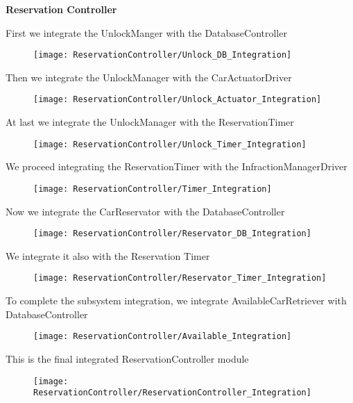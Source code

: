 \begin{Large}
\textbf{Reservation Controller}
\end{Large}

First we integrate the UnlockManger with the DatabaseController
\begin{figure}[H]
\centering
\texttt{[image: ReservationController/Unlock\_DB\_Integration]}
\end{figure}

Then we integrate the UnlockManager with the CarActuatorDriver
\begin{figure}[H]
\centering
\texttt{[image: ReservationController/Unlock\_Actuator\_Integration]}
\end{figure}

At last we integrate the UnlockManager with the ReservationTimer
\begin{figure}[H]
\centering
\texttt{[image: ReservationController/Unlock\_Timer\_Integration]}
\end{figure}

We proceed integrating the ReservationTimer with the InfractionManagerDriver
\begin{figure}[H]
\centering
\texttt{[image: ReservationController/Timer\_Integration]}
\end{figure}

Now we integrate the CarReservator with the DatabaseController
\begin{figure}[H]
\centering
\texttt{[image: ReservationController/Reservator\_DB\_Integration]}
\end{figure}

We integrate it also with the Reservation Timer
\begin{figure}[H]
\centering
\texttt{[image: ReservationController/Reservator\_Timer\_Integration]}
\end{figure}

To complete the subsystem integration, we integrate AvailableCarRetriever with DatabaseController
\begin{figure}[H]
\centering
\texttt{[image: ReservationController/Available\_Integration]}
\end{figure}

This is the final integrated ReservationController module
\begin{figure}[H]
\centering
\texttt{[image: ReservationController/ReservationController\_Integration]}
\end{figure}